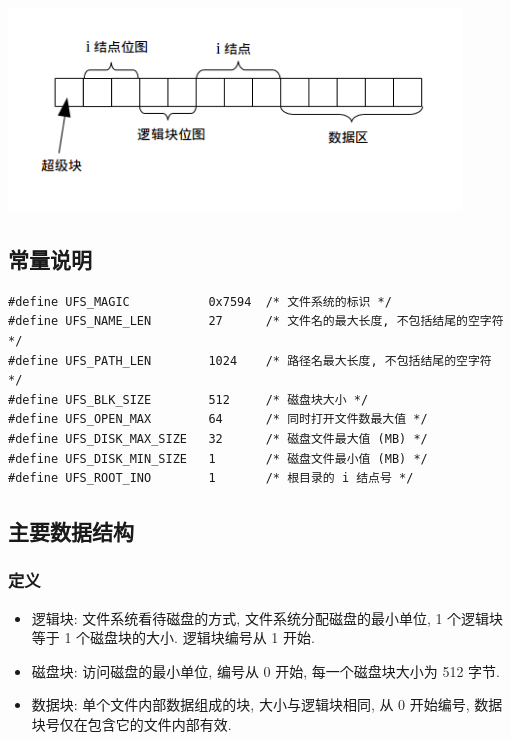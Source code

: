 \documentclass[nofonts]{ctexart}
\begin{document}
\begin{center}
\includegraphics[width=12cm]{./images/./layout.png}
\end{center}
\label{fig:layout}

\subsection{常量说明}\label{ux5e38ux91cfux8bf4ux660e}

\begin{verbatim}
#define UFS_MAGIC           0x7594  /* 文件系统的标识 */
#define UFS_NAME_LEN        27      /* 文件名的最大长度, 不包括结尾的空字符 */
#define UFS_PATH_LEN        1024    /* 路径名最大长度, 不包括结尾的空字符 */
#define UFS_BLK_SIZE        512     /* 磁盘块大小 */
#define UFS_OPEN_MAX        64      /* 同时打开文件数最大值 */
#define UFS_DISK_MAX_SIZE   32      /* 磁盘文件最大值 (MB) */
#define UFS_DISK_MIN_SIZE   1       /* 磁盘文件最小值 (MB) */
#define UFS_ROOT_INO        1       /* 根目录的 i 结点号 */
\end{verbatim}

\subsection{主要数据结构}\label{ux4e3bux8981ux6570ux636eux7ed3ux6784}

\subsubsection{定义}\label{ux5b9aux4e49-1}

\begin{itemize}
\item
  逻辑块: 文件系统看待磁盘的方式, 文件系统分配磁盘的最小单位, 1
  个逻辑块等于 1 个磁盘块的大小. 逻辑块编号从 1 开始.
\item
  磁盘块: 访问磁盘的最小单位, 编号从 0 开始, 每一个磁盘块大小为 512
  字节.
\item
  数据块: 单个文件内部数据组成的块, 大小与逻辑块相同, 从 0 开始编号,
  数据块号仅在包含它的文件内部有效.
\end{itemize}
\end{document}
